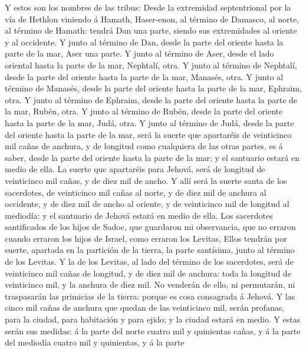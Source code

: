  Y estos son los nombres de las tribus: Desde la
extremidad septentrional por la vía de Hethlon viniendo á Hamath,
Haser-enon, al término de Damasco, al norte, al término de Hamath:
tendrá Dan una parte, siendo sus extremidades al oriente y al occidente.
 Y junto al término de Dan, desde la parte del oriente
hasta la parte de la mar, Aser una parte.  Y junto al
término de Aser, desde el lado oriental hasta la parte de la mar,
Nephtalí, otra.  Y junto al término de Nephtalí, desde la
parte del oriente hasta la parte de la mar, Manasés, otra.
 Y junto al término de Manasés, desde la parte del oriente
hasta la parte de la mar, Ephraim, otra.  Y junto al
término de Ephraim, desde la parte del oriente hasta la parte de la mar,
Rubén, otra.  Y junto al término de Rubén, desde la parte
del oriente hasta la parte de la mar, Judá, otra.  Y junto
al término de Judá, desde la parte del oriente hasta la parte de la mar,
será la suerte que apartaréis de veinticinco mil cañas de anchura, y de
longitud como cualquiera de las otras partes, es á saber, desde la parte
del oriente hasta la parte de la mar; y el santuario estará en medio de
ella.  La suerte que apartaréis para Jehová, será de
longitud de veinticinco mil cañas, y de diez mil de ancho.
 Y allí será la suerte santa de los sacerdotes, de
veinticinco mil cañas al norte, y de diez mil de anchura al occidente, y
de diez mil de ancho al oriente, y de veinticinco mil de longitud al
mediodía: y el santuario de Jehová estará en medio de ella.
 Los sacerdotes santificados de los hijos de Sadoc, que
guardaron mi observancia, que no erraron cuando erraron los hijos de
Israel, como erraron los Levitas,  Ellos tendrán por
suerte, apartada en la partición de la tierra, la parte santísima, junto
al término de los Levitas.  Y la de los Levitas, al lado
del término de los sacerdotes, será de veinticinco mil cañas de
longitud, y de diez mil de anchura: toda la longitud de veinticinco mil,
y la anchura de diez mil.  No venderán de ello, ni
permutarán, ni traspasarán las primicias de la tierra: porque es cosa
consagrada á Jehová.  Y las cinco mil cañas de anchura
que quedan de las veinticinco mil, serán profanas, para la ciudad, para
habitación y para ejido; y la ciudad estará en medio.  Y
estas serán sus medidas: á la parte del norte cuatro mil y quinientas
cañas, y á la parte del mediodía cuatro mil y quinientas, y á la parte
